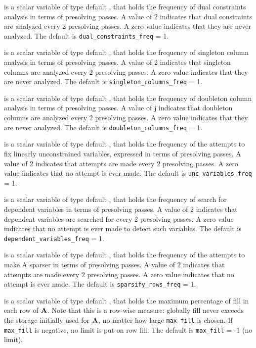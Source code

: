 \documentclass{galahad}
\begin{document}
\begin{description}
 is a scalar variable of type default \integer,
that holds the frequency of dual constraints analysis in terms of
presolving passes.  A value of 2 indicates that dual
constraints are analyzed every 2 presolving passes.  A zero
value indicates that they are never analyzed.
The default is {\tt dual\_constraints\_freq} = 1.

 is a scalar variable of type default \integer,
that holds the frequency of singleton column analysis in terms of
presolving passes.  A value of 2 indicates that
singleton columns are analyzed every 2 presolving passes.
A zero value indicates that they are never analyzed.
The default is {\tt singleton\_columns\_freq} = 1.

 is a scalar variable of type default \integer,
that holds the frequency of doubleton column analysis in terms of
presolving passes.  A value of j indicates that doubleton
columns are analyzed every 2 presolving passes.  A zero
value indicates that they are never analyzed.
The default is {\tt doubleton\_columns\_freq} = 1.

 is a scalar variable of type default \integer,
that holds the frequency of the attempts to fix linearly unconstrained
variables, expressed in terms of presolving passes.  A
value of 2 indicates that attempts are made every 2
presolving passes.  A zero value indicates that no attempt is ever made.
The default is {\tt unc\_variables\_freq} = 1.

 is a scalar variable of type default
\integer, that holds the frequency of search for dependent variables in terms
of  presolving passes.  A value of 2 indicates that
dependent variables are searched for every 2 presolving
passes.  A zero value indicates that no attempt is ever made to detect such
variables. The default is {\tt dependent\_variables\_freq} = 1.

 is a scalar variable of type default \integer,
that holds the frequency of the attempts to make A sparser in terms of
presolving passes.  A value of 2 indicates that attempts
are made every 2 presolving passes.  A zero value indicates
that no attempt is ever made.
The default is {\tt sparsify\_rows\_freq} = 1.

 is a scalar variable of type default \integer, that holds
the maximum percentage of fill in each row of ${\mathbf{A}}$. Note that
this is a row-wise measure: globally fill never exceeds
the storage initially used for ${\mathbf{A}}$, no matter how large
{\tt max\_fill} is chosen. If {\tt max\_fill} is negative,
no limit is put on row fill.
The default is {\tt max\_fill} = -1 (no limit).


\end{description}
\end{document}
